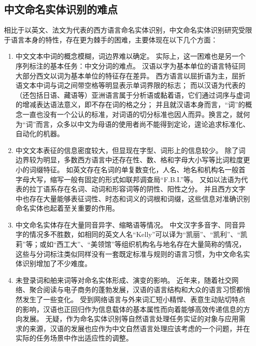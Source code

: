 \subsection{中文命名实体识别的难点}
相比于以英文、法文为代表的西方语言命名实体识别，中文命名实体识别研究受限于语言本身的特性，存在更为棘手的困难，主要体现在以下几个方面：
\begin{enumerate}[\indent(1)]
    \item 中文文本中词的概念模糊，词边界难以确定。
        实际上，这一困难也是另一个序列标注的基本任务：中文分词的难点。
        汉语以字为基本单位的语言特征同大部分西文以词为基本单位的特征存在差异。
        西方语言以屈折语为主，屈折语文本中词与词之间带空格等明显表示单词界限的标志；
        而以汉语为代表的（还包括日语、藏语等）亚洲语言属于分析语或黏着语，它们通过词序与虚词的增减表达语法意义，即不存在词的格之分；
        并且就汉语本身而言，“词”的概念一直也没有一个公认的标准，对词语的切分标准也因人而异。换言之，就何为“词”而言，众多以中文为母语的使用者尚不能得到定论，遑论追求标准化、自动化的机器。
    \item 中文文本表征的信息密度较大，但显现在字型、词形上的信息较少。
        除了词边界较为明显，多数西方语言中还存在性、数、格和字母大小写等比词粒度更小的词缀特征。
        如英文存在名词的单复数变化，人名、地名和机构名一般首字母大写，缩写一般有固定的形式如联邦调查局“F.B.I.”等。
        又如以法语为代表的拉丁语系存在名词、动词和形容词等的阴性、阳性之分。
        并且西方文字中也存在大量能够表征词性、时态和词义的词根和词缀，这些信息对准确识别命名实体也起着至关重要的作用。
    \item 中文命名实体存在大量同音异字、缩略语等情况。
        中文汉字多音字、同音异字的情况多不胜数，如相同的英文人名“Kelly”可以译为“凯丽”、“凯利”、“凯莉”等；或如“西工大”、“美领馆”等组织机构名与地名存在大量简称的情况，这些与分词标注类似同样没有一套既定标准与规则的语言习惯，为中文命名实体识别增加了不少难度。
    \item 未登录词和舶来词等对命名实体形成、演变的影响。
        近年来，随着社交网络、聚合阅读与电子商务的蓬勃发展，汉语的语言结构和大众的语言习惯都悄然发生了一些变化。
        受到网络语言与外来词汇短小精悍、表意生动贴切特点的影响，汉语也正回归作为信息载体的基本属性而向着能够高效传递信息的方向发展。
        无疑，作为命名实体识别等自然语言处理任务实证的对象与应用需求的来源，汉语的发展也应作为中文自然语言处理应该考虑的一个问题，并在实际的任务场景中作出适应性的调整。
\end{enumerate}
